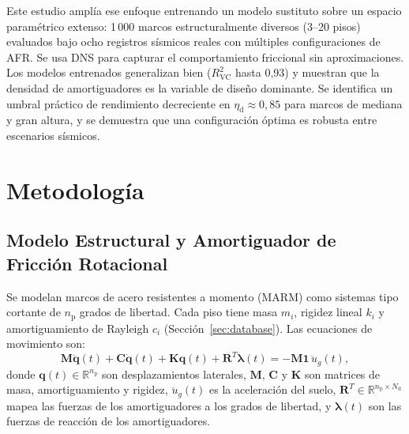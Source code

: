 \documentclass[preprint,12pt,authoryear]{elsarticle}
\newcommand{\Rsq}{R^{2}_{\mathrm{VC}}}
\newcommand{\nd}{N_{\mathrm{d}}}
\newcommand{\np}{n_{\mathrm{p}}}
\newcommand{\etad}{\eta_{\mathrm{d}}}
\begin{document}
Este estudio amplía ese enfoque entrenando un modelo sustituto sobre un espacio paramétrico 
extenso: 1\,000 marcos estructuralmente diversos (3--20 pisos) evaluados bajo ocho registros 
sísmicos reales con múltiples configuraciones de AFR. Se usa DNS para capturar el comportamiento 
friccional sin aproximaciones. Los modelos entrenados generalizan bien ($\Rsq$ hasta 0{,}93) y 
muestran que la densidad de amortiguadores es la variable de diseño dominante. Se identifica un 
umbral práctico de rendimiento decreciente en $\etad \approx 0{,}85$ para marcos de mediana y 
gran altura, y se demuestra que una configuración óptima es robusta entre escenarios sísmicos.

\section{Metodología}
\label{sec:methodology}

\subsection{Modelo Estructural y Amortiguador de Fricción Rotacional}
\label{sec:structural_model}

Se modelan marcos de acero resistentes a momento (MARM) como sistemas tipo cortante de 
$\np$ grados de libertad. Cada piso tiene masa $m_i$, rigidez lineal $k_i$ y amortiguamiento 
de Rayleigh $c_i$ (Sección~\ref{sec:database}). Las ecuaciones de movimiento son:
\begin{equation}
  \mathbf{M}\ddot{\mathbf{q}}(t) + \mathbf{C}\dot{\mathbf{q}}(t) + \mathbf{K}\mathbf{q}(t)
  + \mathbf{R}^T \bm{\lambda}(t) = -\mathbf{M}\mathbf{1}\,\ddot{u}_g(t),
  \label{eq:eom}
\end{equation}
donde $\mathbf{q}(t) \in \mathbb{R}^{\np}$ son desplazamientos laterales, $\mathbf{M}$, 
$\mathbf{C}$ y $\mathbf{K}$ son matrices de masa, amortiguamiento y rigidez, $\ddot{u}_g(t)$ 
es la aceleración del suelo, $\mathbf{R}^T \in \mathbb{R}^{\np \times \nd}$ mapea las fuerzas 
de los amortiguadores a los grados de libertad, y $\bm{\lambda}(t)$ son las fuerzas de reacción 
de los amortiguadores.
\end{document}
